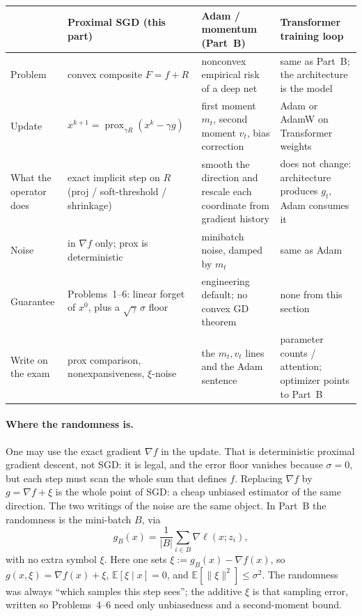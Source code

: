 \documentclass[11pt,a4paper]{article}
\DeclareMathOperator{\prox}{prox}
\theoremstyle{definition}
\begin{document}
\begin{remark}
{\footnotesize
\setlength{\tabcolsep}{3.2pt}
\renewcommand{\arraystretch}{1.18}
\noindent
\begin{tabularx}{\linewidth}{|
  >{\raggedright\arraybackslash}p{2.35cm}|
  >{\raggedright\arraybackslash}X|
  >{\raggedright\arraybackslash}X|
  >{\raggedright\arraybackslash}X|
}
\hline
& Proximal SGD (this part)
& Adam / momentum (Part~B)
& Transformer training loop \\
\hline
Problem &
convex composite $F=f+R$ &
nonconvex empirical risk of a deep net &
same as Part~B; the architecture is the model \\
\hline
Update &
$x^{k+1}=\prox_{\gamma R}(x^k-\gamma g)$ &
first moment $m_t$, second moment $v_t$, bias correction &
Adam or AdamW on Transformer weights \\
\hline
What the operator does &
exact implicit step on $R$ (proj / soft-threshold / shrinkage) &
smooth the direction and rescale each coordinate from gradient history &
does not change: architecture produces $g_t$, Adam consumes it \\
\hline
Noise &
in $\nabla f$ only; prox is deterministic &
minibatch noise, damped by $m_t$ &
same as Adam \\
\hline
Guarantee &
Problems~1--6: linear forget of $x^0$, plus a $\sqrt{\gamma}\,\sigma$ floor &
engineering default; no convex GD theorem &
none from this section \\
\hline
Write on the exam &
prox comparison, nonexpansiveness, $\xi$-noise &
the $m_t,v_t$ lines and the Adam sentence &
parameter counts / attention; optimizer points to Part~B \\
\hline
\end{tabularx}
}

\paragraph{Where the randomness is.}
One may use the exact gradient \(\nabla f\) in the update. That is deterministic
proximal gradient descent, not SGD: it is legal, and the error floor vanishes
because \(\sigma=0\), but each step must scan the whole sum that defines \(f\).
Replacing \(\nabla f\) by \(g=\nabla f+\xi\) is the whole point of SGD: a cheap
unbiased estimator of the same direction. The two writings of the noise are the
same object. In Part~B the randomness is the mini-batch \(B\), via
\[
g_B(x)=\frac1{|B|}\sum_{i\in B}\nabla\ell(x;z_i),
\]
with no extra symbol \(\xi\). Here one sets
\(\xi:=g_B(x)-\nabla f(x)\), so \(g(x,\xi)=\nabla f(x)+\xi\),
\(\mathbb{E}[\xi\mid x]=0\), and \(\mathbb{E}[\|\xi\|^2]\le\sigma^2\). The
randomness was always ``which samples this step sees''; the additive \(\xi\) is
that sampling error, written so Problems~4--6 need only unbiasedness and a
second-moment bound.
\end{remark}
\end{document}
